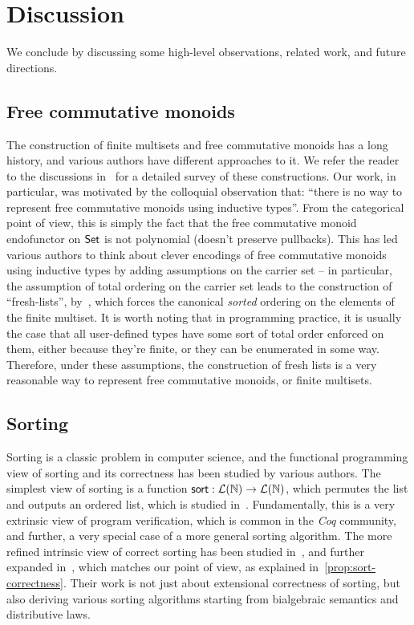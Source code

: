 
\section{Discussion}
\label{sec:discussion}

We conclude by discussing some high-level observations, related work, and future directions.

\subsection*{Free commutative monoids}

The construction of finite multisets and free commutative monoids has a long history, and various authors have different
approaches to it. We refer the reader to the discussions
in~\cite{choudhuryFreeCommutativeMonoids2023,joramConstructiveFinalSemantics2023} for a detailed survey of these
constructions.
%
Our work, in particular, was motivated by the colloquial observation that:
``there is no way to represent free commutative monoids using inductive types''.
%
From the categorical point of view, this is simply the fact that the free commutative monoid endofunctor on $\mathsf{Set}$ is
not polynomial (doesn't preserve pullbacks).
%
This has led various authors to think about clever encodings of free commutative monoids using inductive types by adding
assumptions on the carrier set -- in particular, the assumption of total ordering on the carrier set leads to the
construction of ``fresh-lists'', by~\cite{kupkeFreshLookCommutativity2023}, which forces the canonical \emph{sorted}
ordering on the elements of the finite multiset.
%
It is worth noting that in programming practice,
it is usually the case that all user-defined types have some sort of total order enforced on them,
either because they're finite, or they can be enumerated in some way.
%
Therefore, under these assumptions, the construction of fresh lists is a very reasonable way to represent free
commutative monoids, or finite multisets.

\subsection*{Sorting}

Sorting is a classic problem in computer science, and the functional programming view of sorting and its correctness has
been studied by various authors.
%
The simplest view of sorting is a function $\operatorname{\mathsf{sort}}: \mathcal{L}(\mathbb{N}) \to \mathcal{L}(\mathbb{N})$,
which permutes the list and outputs an ordered list, which is studied in~\cite{appelVerifiedFunctionalAlgorithms2023}.
%
Fundamentally, this is a very extrinsic view of program verification, which is common in the \emph{Coq} community,
and further, a very special case of a more general sorting algorithm.
%
The more refined intrinsic view of correct sorting has been studied in~\cite{hinzeSortingBialgebrasDistributive2012},
and further expanded in~\cite{alexandruIntrinsicallyCorrectSorting2023}, which matches our point of view, as explained
in~\cref{prop:sort-correctness}.
%
Their work is not just about extensional correctness of sorting, but also deriving various sorting algorithms
starting from bialgebraic semantics and distributive laws.

